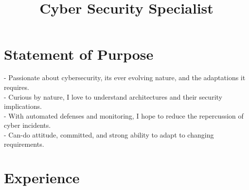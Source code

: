 \documentclass[mm, 11pt]{simple_style}
\begin{document}
\begin{resume}
\section{Statement of Purpose}

- Passionate about cybersecurity, its ever evolving nature, and the adaptations it requires.\\
- Curious by nature, I love to understand architectures and their security implications.\\
- With automated defenses and monitoring, I hope to reduce the repercussion of cyber incidents.\\
- Can-do attitude, committed, and strong ability to adapt to changing requirements.\\
%
\sectionline

\section{Experience}
\begin{position}
    \title{Cyber Security Specialist}
\end{position}
\end{resume}
\end{document}
